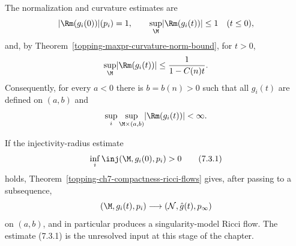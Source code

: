 The normalization and curvature estimates are
\[
\lvert\Rm(g_i(0))\rvert(p_i)=1,
\qquad
\sup_{\M}\lvert\Rm(g_i(t))\rvert\leq 1\quad (t\leq0),
\]
and, by Theorem~\ref{topping-maxpr-curvature-norm-bound}, for $t>0$,
\[
\sup_{\M}\lvert\Rm(g_i(t))\rvert
\leq\frac{1}{1-C(n)t}.
\]
Consequently, for every $a<0$ there is $b=b(n)>0$ such that all $g_i(t)$ are
defined on $(a,b)$ and
\[
\sup_i\sup_{\M\times(a,b)}\lvert\Rm(g_i(t))\rvert<\infty.
\]

If the injectivity-radius estimate
\begin{equation}
\inf_i\inj(\M,g_i(0),p_i)>0
\tag{7.3.1}
\end{equation}
holds, Theorem~\ref{topping-ch7-compactness-ricci-flows} gives, after passing to a subsequence,
\[
(\M,g_i(t),p_i)\longrightarrow(\mathcal{N},\hat g(t),p_\infty)
\]
on $(a,b)$, and in particular produces a singularity-model Ricci flow.
The estimate (7.3.1) is the unresolved input at this stage of the chapter.
